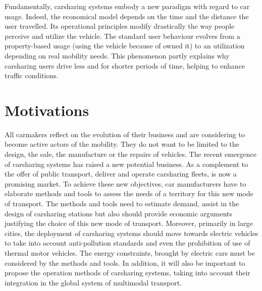 \medskip
Fundamentally, carsharing systems embody a new paradigm with regard to car usage.
Indeed, the economical model depends on the time and the distance the user travelled.
Its operational principles modify drastically the way people perceive and utilize the vehicle.
The standard user behaviour evolves from a property-based usage (\ie using the vehicle because of owned it) to an utilization depending on real mobility needs.
This phenomenon partly explains why carsharing users drive less and for shorter periods of time, helping to enhance traffic conditions.





\section{Motivations}

All carmakers reflect on the evolution of their business and are considering to become active actors of the mobility. 
They do not want to be limited to the design, the sale, the manufacture or the repairs of vehicles.
The recent emergence of carsharing systems has raised a new potential business.
As a complement to the offer of public transport, deliver and operate carsharing fleets, is now a promising market.
To achieve these new objectives, car manufacturers have to elaborate methods and tools to assess the needs of a territory for this new mode of transport.
The methods and tools need to estimate demand, assist in the design of carsharing stations but also should provide economic arguments justifying the choice of this new mode of transport.
Moreover, primarily in large cities, the deployment of carsharing systems should move towards electric vehicles to take into account anti-pollution standards and even the prohibition of use of thermal motor vehicles.
The energy constraints, brought by electric cars must be considered by the methods and tools.
In addition, it will also be important to propose the operation methods of carsharing systems, taking into account their integration in the global system of multimodal transport.

